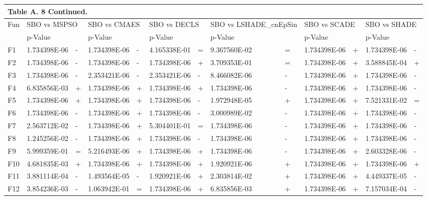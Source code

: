 \documentclass{article} %
\begin{document}
\begin{tabular}{|p{0.3in}|p{0.6in}|p{0.2in}|p{0.6in}|p{0.2in}|p{0.6in}|p{0.2in}|p{0.6in}|p{0.2in}|p{0.6in}|p{0.2in}|p{0.6in}|p{0.2in}|} \hline 
\multicolumn{13}{|p{1in}|}{Table A. 8 Continued.} \\ \hline 
Fun & \multicolumn{2}{|p{0.8in}|}{SBO vs MSPSO} & \multicolumn{2}{|p{0.8in}|}{SBO vs CMAES} & \multicolumn{2}{|p{0.8in}|}{SBO vs DECLS} & \multicolumn{2}{|p{0.8in}|}{SBO vs LSHADE\_cnEpSin} & \multicolumn{2}{|p{0.8in}|}{SBO vs SCADE} & \multicolumn{2}{|p{0.8in}|}{SBO vs SHADE} \\ \hline 
 & p-Value &  & p-Value &  & p-Value &  & p-Value &  & p-Value &  & p-Value &  \\ \hline 
F1 & 1.734398E-06 & - & 1.734398E-06 & - & 4.165338E-01 & = & 9.367560E-02 & = & 1.734398E-06 & + & 1.734398E-06 & - \\ \hline 
F2 & 1.734398E-06 & - & 1.734398E-06 & - & 1.734398E-06 & + & 3.709353E-01 & = & 1.734398E-06 & + & 3.588845E-04 & + \\ \hline 
F3 & 1.734398E-06 & - & 2.353421E-06 & - & 2.353421E-06 & - & 8.466082E-06 & - & 1.734398E-06 & + & 1.734398E-06 & - \\ \hline 
F4 & 6.835856E-03 & + & 1.734398E-06 & + & 1.734398E-06 & + & 1.734398E-06 & - & 1.734398E-06 & + & 1.734398E-06 & - \\ \hline 
F5 & 1.734398E-06 & + & 1.734398E-06 & + & 1.734398E-06 & - & 1.972948E-05 & + & 1.734398E-06 & + & 7.521331E-02 & = \\ \hline 
F6 & 1.734398E-06 & - & 1.734398E-06 & + & 1.734398E-06 & - & 3.000989E-02 & - & 1.734398E-06 & + & 1.734398E-06 & - \\ \hline 
F7 & 2.563712E-02 & - & 1.734398E-06 & + & 5.304401E-01 & = & 1.734398E-06 & - & 1.734398E-06 & + & 1.734398E-06 & - \\ \hline 
F8 & 1.245256E-02 & - & 1.734398E-06 & + & 1.734398E-06 & - & 1.734398E-06 & - & 1.734398E-06 & + & 1.734398E-06 & - \\ \hline 
F9 & 5.999359E-01 & = & 5.216493E-06 & + & 1.734398E-06 & + & 1.734398E-06 & - & 1.734398E-06 & + & 2.603328E-06 & - \\ \hline 
F10 & 4.681835E-03 & + & 1.734398E-06 & + & 1.734398E-06 & + & 1.920921E-06 & + & 1.734398E-06 & + & 1.734398E-06 & + \\ \hline 
F11 & 3.881114E-04 & - & 1.493564E-05 & - & 1.920921E-06 & + & 2.303814E-02 & + & 1.734398E-06 & + & 4.449337E-05 & - \\ \hline 
F12 & 3.854236E-03 & - & 1.063942E-01 & = & 1.734398E-06 & + & 6.835856E-03 & + & 1.734398E-06 & + & 7.157034E-04 & - \\ \hline 

\end{tabular}
\end{document}
